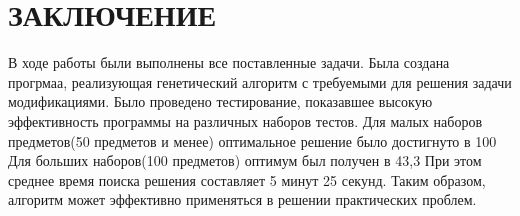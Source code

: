 ﻿\chapter*{ЗАКЛЮЧЕНИЕ}
В ходе работы были выполнены все поставленные задачи. Была создана прогрмаа, реализующая генетический алгоритм с требуемыми для решения задачи модификациями.
Было проведено тестирование, показавшее высокую эффективность программы на различных наборов тестов.
Для малых наборов предметов(50 предметов и менее) оптимальное решение было достигнуто в 100%
Для больших наборов(100 предметов) оптимум был получен в 43,3%
При этом среднее время поиска решения составляет 5 минут 25 секунд. 
Таким образом, алгоритм может эффективно применяться в решении практических проблем.
